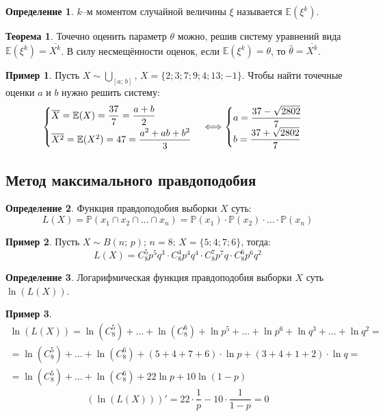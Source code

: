 \documentclass[12pt]{article}
\theoremstyle{definition}
\newtheorem{theorem}{Теорема}[section]
\newtheorem*{example}{Пример}
\newtheorem{definition}{Определение}
\newcommand{\E}{\mathbb{E}}
\newcommand{\prob}{\mathbb{P}}
\begin{document}
\begin{definition}
    $k$–м моментом случайной величины $\xi$ называется $\E(\xi^k)$.
\end{definition}
\begin{theorem}
    Точечно оценить параметр $\theta$ можно, решив систему уравнений вида $\E(\xi^k)=\overline{X^k}$. В силу несмещённости оценок, если $\E(\xi^k)=\theta$, то $\hat\theta=\overline{X^k}$.
\end{theorem}
\begin{example}
    Пусть $X\sim\bigcup_{[a;\,b]},\,X=\{2;3;7;9;4;13;-1\}$. Чтобы найти точечные оценки $a$ и $b$ нужно решить систему:
    $$\begin{cases}
        \overline{X}=\E(X)=\dfrac{37}{7}=\dfrac{a+b}{2}\\[2\jot]
        \overline{X^2}=\E(X^2)=47=\dfrac{a^2+ab+b^2}{3}
    \end{cases}\Longleftrightarrow\begin{cases}
        a=\dfrac{37-\sqrt{2802}}{7}\\
        b=\dfrac{37+\sqrt{2802}}{7}
    \end{cases}$$
\end{example}

\subsection{Метод максимального правдоподобия}

\begin{definition}
    Функция правдоподобия выборки $X$ суть:
    $$L(X)=\prob(x_1\cap x_2\cap\ldots\cap x_n)=\prob(x_1)\cdot\prob(x_2)\cdot\ldots\cdot\prob(x_n)$$
\end{definition}
\begin{example}
    Пусть $X\sim B(n;\,p);\,n=8;\,X=\{5;4;7;6\}$, тогда:
    $$L(X)=C_8^5p^5q^3\cdot C_8^4p^4q^4\cdot C_8^7p^7q\cdot C_8^6p^6q^2$$
\end{example}
\begin{definition}
    Логарифмическая функция правдоподобия выборки $X$ суть $\ln(L(X))$.
\end{definition}
\begin{example}
    \begin{multline*}
        \ln(L(X))=\ln(C_8^5)+\ldots+\ln(C_8^6)+\ln p^5+\ldots+\ln p^6+\ln q^3+\ldots+\ln q^2=\\
        =\ln(C_8^5)+\ldots+\ln(C_8^6)+(5+4+7+6)\cdot\ln p+(3+4+1+2)\cdot\ln q=\\
        =\ln(C_8^5)+\ldots+\ln(C_8^6)+22\ln p+10\ln(1-p)
    \end{multline*}
    $$\left(\ln(L(X))\right)'=22\cdot\dfrac{1}{p}-10\cdot\dfrac{1}{1-p}=0$$
\end{example}
\end{document}
